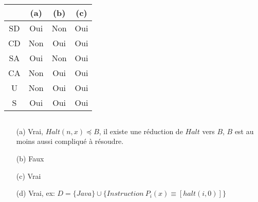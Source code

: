 \subsection{}
\nosolution

\subsection{}

\begin{center}
\begin{tabular}{c|c|c|c}
& (a) & (b) & (c) \\
\hline
SD & Oui & Non & Oui \\
CD & Non & Oui & Oui \\
SA & Oui & Non & Oui \\
CA & Non & Oui & Oui \\
U & Non & Oui & Oui \\
S & Oui & Oui & Oui \\
\end{tabular}
\end{center}

\subsection{}
\begin{itemize}
	\item[(a)] Vrai, $Halt(n,x) \preceq B$, il existe une réduction de $Halt$ vers $B$, $B$ est au moins aussi compliqué à résoudre.
	\item[(b)] Faux
	\item[(c)] Vrai
	\item[(d)] Vrai, ex: $D = \{Java\} \cup \{Instruction\ P_i(x)\equiv[halt(i,0)]\}$
\end{itemize}
